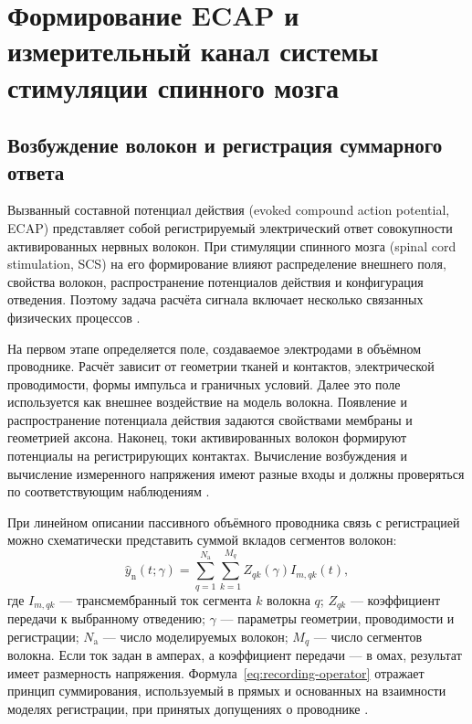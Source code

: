 \section{Формирование ECAP и измерительный канал системы стимуляции спинного мозга}
\label{sec:ecap-channel}

\subsection{Возбуждение волокон и регистрация суммарного ответа}

Вызванный составной потенциал действия (evoked compound action potential, ECAP) представляет собой регистрируемый электрический ответ совокупности активированных нервных волокон. При стимуляции спинного мозга (spinal cord stimulation, SCS) на его формирование влияют распределение внешнего поля, свойства волокон, распространение потенциалов действия и конфигурация отведения. Поэтому задача расчёта сигнала включает несколько связанных физических процессов \cite{ecapmodel,s285}.

На первом этапе определяется поле, создаваемое электродами в объёмном проводнике. Расчёт зависит от геометрии тканей и контактов, электрической проводимости, формы импульса и граничных условий. Далее это поле используется как внешнее воздействие на модель волокна. Появление и распространение потенциала действия задаются свойствами мембраны и геометрией аксона. Наконец, токи активированных волокон формируют потенциалы на регистрирующих контактах. Вычисление возбуждения и вычисление измеренного напряжения имеют разные входы и должны проверяться по соответствующим наблюдениям \cite{ecapmodel,posture}.

При линейном описании пассивного объёмного проводника связь с регистрацией можно схематически представить суммой вкладов сегментов волокон:
\begin{equation}
 \widehat y_{\mathrm n}(t;\gamma)=
 \sum_{q=1}^{N_{\mathrm a}}\sum_{k=1}^{M_q}
 Z_{qk}(\gamma) I_{m,qk}(t),
 \label{eq:recording-operator}
\end{equation}
где $I_{m,qk}$ --- трансмембранный ток сегмента $k$ волокна $q$; $Z_{qk}$ --- коэффициент передачи к выбранному отведению; $\gamma$ --- параметры геометрии, проводимости и регистрации; $N_{\mathrm a}$ --- число моделируемых волокон; $M_q$ --- число сегментов волокна. Если ток задан в амперах, а коэффициент передачи --- в омах, результат имеет размерность напряжения. Формула~\eqref{eq:recording-operator} отражает принцип суммирования, используемый в прямых и основанных на взаимности моделях регистрации, при принятых допущениях о проводнике \cite{ecapmodel,posture}.

